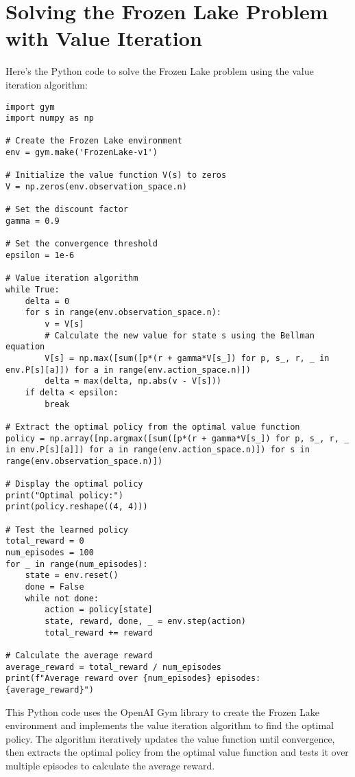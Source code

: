 \documentclass{article}
\begin{document}
\section*{Solving the Frozen Lake Problem with Value Iteration}

Here's the Python code to solve the Frozen Lake problem using the value iteration algorithm:

\begin{lstlisting}
import gym
import numpy as np

# Create the Frozen Lake environment
env = gym.make('FrozenLake-v1')

# Initialize the value function V(s) to zeros
V = np.zeros(env.observation_space.n)

# Set the discount factor
gamma = 0.9

# Set the convergence threshold
epsilon = 1e-6

# Value iteration algorithm
while True:
    delta = 0
    for s in range(env.observation_space.n):
        v = V[s]
        # Calculate the new value for state s using the Bellman equation
        V[s] = np.max([sum([p*(r + gamma*V[s_]) for p, s_, r, _ in env.P[s][a]]) for a in range(env.action_space.n)])
        delta = max(delta, np.abs(v - V[s]))
    if delta < epsilon:
        break

# Extract the optimal policy from the optimal value function
policy = np.array([np.argmax([sum([p*(r + gamma*V[s_]) for p, s_, r, _ in env.P[s][a]]) for a in range(env.action_space.n)]) for s in range(env.observation_space.n)])

# Display the optimal policy
print("Optimal policy:")
print(policy.reshape((4, 4)))

# Test the learned policy
total_reward = 0
num_episodes = 100
for _ in range(num_episodes):
    state = env.reset()
    done = False
    while not done:
        action = policy[state]
        state, reward, done, _ = env.step(action)
        total_reward += reward

# Calculate the average reward
average_reward = total_reward / num_episodes
print(f"Average reward over {num_episodes} episodes: {average_reward}")
\end{lstlisting}

This Python code uses the OpenAI Gym library to create the Frozen Lake environment and implements the value iteration algorithm to find the optimal policy. The algorithm iteratively updates the value function until convergence, then extracts the optimal policy from the optimal value function and tests it over multiple episodes to calculate the average reward.
\end{document}
